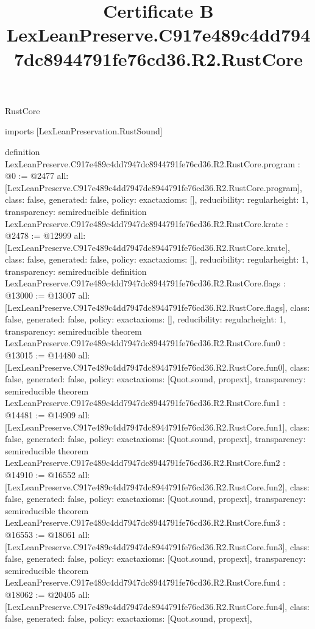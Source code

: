 \begin{lexlean}{RustCore}
\title{Certificate B LexLeanPreserve.C917e489c4dd7947dc8944791fe76cd36.R2.RustCore}
\begin{coremodule}
imports [LexLeanPreservation.RustSound]

definition LexLeanPreserve.C917e489c4dd7947dc8944791fe76cd36.R2.RustCore.program : @0 := @2477 {
  all: [LexLeanPreserve.C917e489c4dd7947dc8944791fe76cd36.R2.RustCore.program],
  class: false,
  generated: false,
  policy: exact{axioms: []},
  reducibility: regular{height: 1},
  transparency: semireducible
}
definition LexLeanPreserve.C917e489c4dd7947dc8944791fe76cd36.R2.RustCore.krate : @2478 := @12999 {
  all: [LexLeanPreserve.C917e489c4dd7947dc8944791fe76cd36.R2.RustCore.krate],
  class: false,
  generated: false,
  policy: exact{axioms: []},
  reducibility: regular{height: 1},
  transparency: semireducible
}
definition LexLeanPreserve.C917e489c4dd7947dc8944791fe76cd36.R2.RustCore.flags : @13000 := @13007 {
  all: [LexLeanPreserve.C917e489c4dd7947dc8944791fe76cd36.R2.RustCore.flags],
  class: false,
  generated: false,
  policy: exact{axioms: []},
  reducibility: regular{height: 1},
  transparency: semireducible
}
theorem LexLeanPreserve.C917e489c4dd7947dc8944791fe76cd36.R2.RustCore.fun0 : @13015 := @14480 {
  all: [LexLeanPreserve.C917e489c4dd7947dc8944791fe76cd36.R2.RustCore.fun0],
  class: false,
  generated: false,
  policy: exact{axioms: [Quot.sound, propext]},
  transparency: semireducible
}
theorem LexLeanPreserve.C917e489c4dd7947dc8944791fe76cd36.R2.RustCore.fun1 : @14481 := @14909 {
  all: [LexLeanPreserve.C917e489c4dd7947dc8944791fe76cd36.R2.RustCore.fun1],
  class: false,
  generated: false,
  policy: exact{axioms: [Quot.sound, propext]},
  transparency: semireducible
}
theorem LexLeanPreserve.C917e489c4dd7947dc8944791fe76cd36.R2.RustCore.fun2 : @14910 := @16552 {
  all: [LexLeanPreserve.C917e489c4dd7947dc8944791fe76cd36.R2.RustCore.fun2],
  class: false,
  generated: false,
  policy: exact{axioms: [Quot.sound, propext]},
  transparency: semireducible
}
theorem LexLeanPreserve.C917e489c4dd7947dc8944791fe76cd36.R2.RustCore.fun3 : @16553 := @18061 {
  all: [LexLeanPreserve.C917e489c4dd7947dc8944791fe76cd36.R2.RustCore.fun3],
  class: false,
  generated: false,
  policy: exact{axioms: [Quot.sound, propext]},
  transparency: semireducible
}
theorem LexLeanPreserve.C917e489c4dd7947dc8944791fe76cd36.R2.RustCore.fun4 : @18062 := @20405 {
  all: [LexLeanPreserve.C917e489c4dd7947dc8944791fe76cd36.R2.RustCore.fun4],
  class: false,
  generated: false,
  policy: exact{axioms: [Quot.sound, propext]},
}
\end{coremodule}
\end{lexlean}
